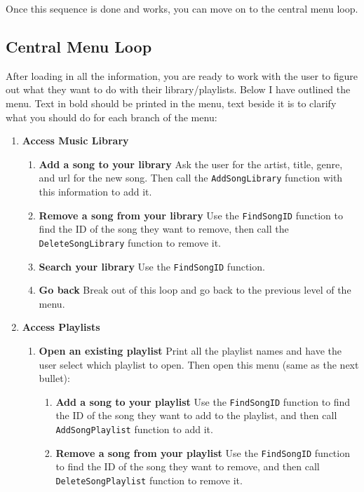 Once this sequence is done and works, you can move on to the central menu loop. 

\subsection{Central Menu Loop \star \star \star \star \star}

After loading in all the information, you are ready to work with the user to figure out what they want to do with their library/playlists. Below I have outlined the menu. Text in bold should be printed in the menu, text beside it is to clarify what you should do for each branch of the menu:

\begin{enumerate}
    \item \textbf{Access Music Library}
        \begin{enumerate}
            \item \textbf{Add a song to your library} Ask the user for the artist, title, genre, and url for the new song. Then call the \texttt{AddSongLibrary} function with this information to add it. 
            \item \textbf{Remove a song from your library} Use the \texttt{FindSongID} function to find the ID of the song they want to remove, then call the \texttt{DeleteSongLibrary} function to remove it.
            \item \textbf{Search your library} Use the \texttt{FindSongID} function.
            \item \textbf{Go back} Break out of this loop and go back to the previous level of the menu.
        \end{enumerate}
    \item \textbf{Access Playlists}
        \begin{enumerate}
            \item \textbf{Open an existing playlist} Print all the playlist names and have the user select which playlist to open. Then open this menu (same as the next bullet):
                \begin{enumerate}
                    \item \textbf{Add a song to your playlist} Use the \texttt{FindSongID} function to find the ID of the song they want to add to the playlist, and then call \texttt{AddSongPlaylist} function to add it. 
                    \item \textbf{Remove a song from your playlist} Use the \texttt{FindSongID} function to find the ID of the song they want to remove, and then call \texttt{DeleteSongPlaylist} function to remove it. 

\end{enumerate}
\end{enumerate}
\end{enumerate}

